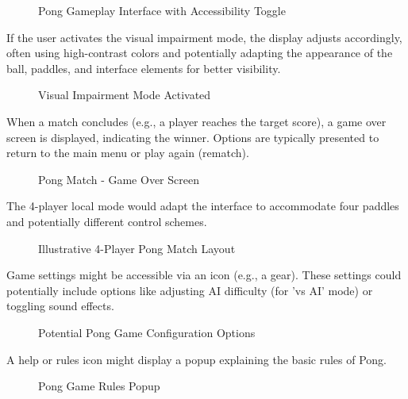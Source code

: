 \begin{figure}[H]
    \caption{Pong Gameplay Interface with Accessibility Toggle}
    \label{fig:game-interface}
\end{figure}

If the user activates the visual impairment mode, the display adjusts accordingly, often using high-contrast colors and potentially adapting the appearance of the ball, paddles, and interface elements for better visibility.

\begin{figure}[H]
    \caption{Visual Impairment Mode Activated}
    \label{fig:impairment-mode}
\end{figure}

When a match concludes (e.g., a player reaches the target score), a game over screen is displayed, indicating the winner. Options are typically presented to return to the main menu or play again (rematch).

\begin{figure}[H]
    \caption{Pong Match - Game Over Screen}
    \label{fig:gameover}
\end{figure}

The 4-player local mode would adapt the interface to accommodate four paddles and potentially different control schemes.

\begin{figure}[H]
    \caption{Illustrative 4-Player Pong Match Layout}
    \label{fig:4player-match}
\end{figure}

Game settings might be accessible via an icon (e.g., a gear). These settings could potentially include options like adjusting AI difficulty (for 'vs AI' mode) or toggling sound effects.

\begin{figure}[H]
    \caption{Potential Pong Game Configuration Options}
    \label{fig:config}
\end{figure}

A help or rules icon might display a popup explaining the basic rules of Pong.

\begin{figure}[H]
    \caption{Pong Game Rules Popup}
    \label{fig:game-rules}
\end{figure}

